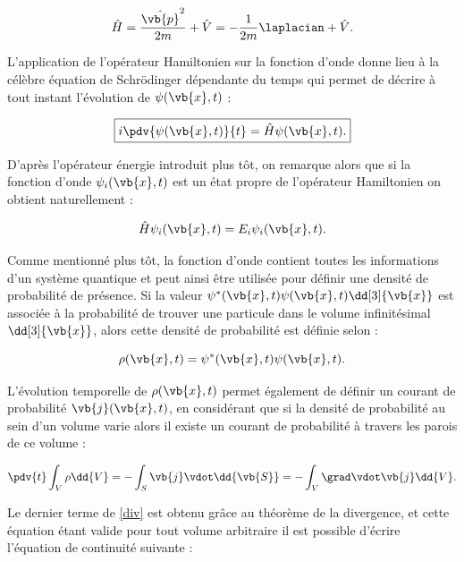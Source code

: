         \begin{equation}
                \hat{H}=\frac{\hat{\vb{p}}^2}{2m}+\hat{V}=-\frac{1}{2m}\laplacian + \hat{V}.
        \end{equation}
        
        L'application de l'opérateur Hamiltonien sur la fonction d'onde donne lieu à la célèbre équation de Schrödinger dépendante du temps qui permet de décrire à tout instant l'évolution de $\psi(\vb{x},t)$ :
        
        \begin{equation}
        \boxed{
            i\pdv{\psi(\vb{x},t)}{t}=\hat{H}\psi(\vb{x},t).
        }
        \end{equation}
        
        D'après l'opérateur énergie introduit plus tôt, on remarque alors que si la fonction d'onde $\psi_i(\vb{x},t)$ est un état propre de l'opérateur Hamiltonien on obtient naturellement :
        
        \begin{equation}
            \hat{H}\psi_i(\vb{x},t)=E_i\psi_i(\vb{x},t).
        \end{equation}
        
        Comme mentionné plus tôt, la fonction d'onde contient toutes les informations d'un système quantique et peut ainsi être utilisée pour définir une densité de probabilité de présence. Si la valeur $\psi^*(\vb{x},t)\psi(\vb{x},t)\dd[3]{\vb{x}}$ est associée à la probabilité de trouver une particule dans le volume infinitésimal $\dd[3]{\vb{x}}$, alors cette densité de probabilité est définie selon :
        
        \begin{equation}
            \rho(\vb{x},t)=\psi^*(\vb{x},t)\psi(\vb{x},t).
        \end{equation}
        
        L'évolution temporelle de $\rho(\vb{x},t)$ permet également de définir un courant de probabilité $\vb{j}(\vb{x},t)$, en considérant que si la densité de probabilité au sein d'un volume varie alors il existe un courant de probabilité à travers les parois de ce volume :
        
        \begin{equation}
            \pdv{t}\int_V\rho\dd{V}=-\int_S\vb{j}\vdot \dd{\vb{S}}=-\int_V\grad\vdot\vb{j}\dd{V}.
            \label{div}
        \end{equation}

        Le dernier terme de \ref{div} est obtenu grâce au théorème de la divergence, et cette équation étant valide pour tout volume arbitraire il est possible d'écrire l'équation de continuité suivante :

